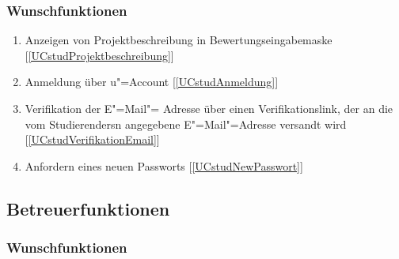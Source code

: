 \documentclass[parskip=full]{scrartcl}
\newcommand{\swtLabel}[1]{\textbf{/#1\arabic*0/}}
\newcommand{\testRef}[1]{[\ref{#1}]}
\begin{document}
\subsubsection{Wunschfunktionen}

\begin{enumerate}[label=\swtLabel{FA}, resume]
	\item Anzeigen von \gls{Projekt}beschreibung in \gls{Bewertung}seingabemaske
	\label{FAbeschreibung-Bewertung} \testRef{UCstudProjektbeschreibung}
	\item Anmeldung über u"=Account \label{FAstudUanmeldung} \testRef{UCstudAnmeldung}%
	\item Verifikation der E"=Mail"= Adresse über einen Verifikationslink, der an
	die vom \glspl{Studierender}n angegebene E"=Mail"=Adresse versandt wird
	\label{FAemailverifikation} \testRef{UCstudVerifikationEmail}
	\item Anfordern eines neuen Passworts \label{FApasswortvergessen}
	\testRef{UCstudNewPasswort}
\end{enumerate}

\subsection{Betreuerfunktionen}
\subsubsection{Wunschfunktionen}
\end{document}
